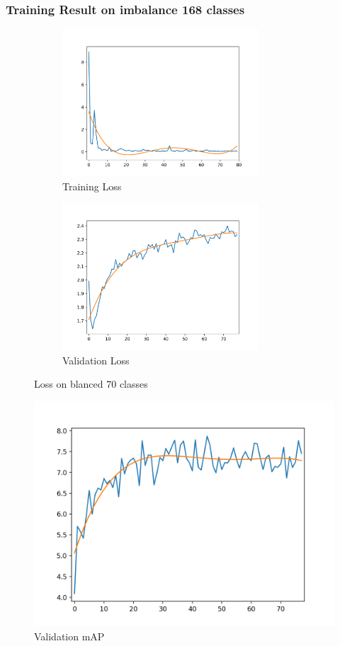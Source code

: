 \documentclass[12pt,a4paper]{report}
\begin{document}
\subsubsection{Training Result on imbalance 168 classes}
\begin{figure}[h]
\begin{subfigure}{0.5\linewidth}
	\includegraphics[height=5.5cm,width=\textwidth]{smaller_loss_train.png}
	\caption{Training Loss}
\end{subfigure}
\begin{subfigure}{0.5\linewidth}
	\includegraphics[height=5.5cm,width=\textwidth]{smaller_loss_val.png}
	\caption{Validation Loss}
\end{subfigure}
\label{Training set 1}
\caption{Loss on blanced 70 classes }

\end{figure}
\begin{figure}[h]
\centering
\includegraphics[width=0.6\linewidth]{smaller_mAP_val.png}
\caption{Validation mAP}
\end{figure}
\newpage
\end{document}
